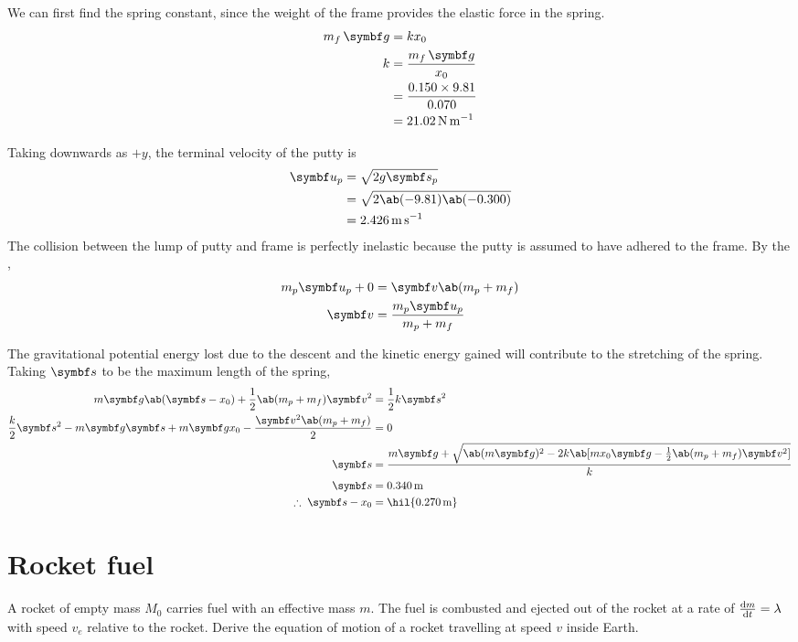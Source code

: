 We can first find the spring constant, since the weight of the frame
provides the elastic force in the spring.
\begin{align*}
  m_f\,\mv{g} &= kx_0 \\
  k &= \f{m_f\,\mv{g}}{x_0} \\
  &= \f{0.150\times 9.81}{0.070} \\
  &= \qty{21.02}{\newton\per\metre}
\end{align*}

Taking downwards as \(+y\), the terminal velocity of the putty is
\begin{align*}
  \mv{u}_p &= \sqrt{2g\mv{s}_p} \\
  &= \sqrt{2\ab(-9.81)\ab(-0.300)} \\
  &= \qty{2.426}{\metre\per\second}
\end{align*}
The collision between the lump of putty and frame is perfectly
inelastic because the putty is assumed to
have adhered to the frame. By the ,
\begin{align*}
  m_p\mv{u}_p + 0 &= \mv{v}\ab(m_p + m_f) \\
  \mv{v} &= \f{m_p\mv{u}_p}{m_p + m_f}
\end{align*}

The gravitational potential energy lost due to the descent and the
kinetic energy
gained will contribute to the stretching of the spring. Taking \(\mv{s}\) to be
the maximum length of the spring,
\begin{align*}
  m\mv{g}\ab(\mv{s}-x_0) + \f{1}{2}\ab(m_p + m_f)\mv{v}^2 &=
  \f{1}{2}k\mv{s}^2 \\
  \f{k}{2}\mv{s}^2 - m\mv{g}\mv{s} + m\mv{g}x_0 -
  \f{\mv{v}^2\ab(m_p+m_f)}{2} &= 0 \\
  \mv{s} &= \f{m\mv{g} + \sqrt{\ab(m\mv{g})^2 - 2k\ab[mx_0\mv{g} -
  \f{1}{2}\ab(m_p + m_f)\mv{v}^2]}}{k} \\
  \mv{s} &= \qty{0.340}{\metre} \\
  \therefore\;\mv{s} - x_0 &= \hil{\qty{0.270}{\metre}}
\end{align*}

\section{Rocket fuel}
\begin{problem}
  A rocket of empty mass \(M_0\) carries fuel with an effective mass \(m\).
  The fuel is combusted and ejected out of the rocket at a rate of
  \(\odv{m}{t} = \lambda\)
  with speed \(v_e\) relative to the rocket. Derive the equation of
  motion of a rocket travelling at speed \(v\) inside
  Earth.
\end{problem}

